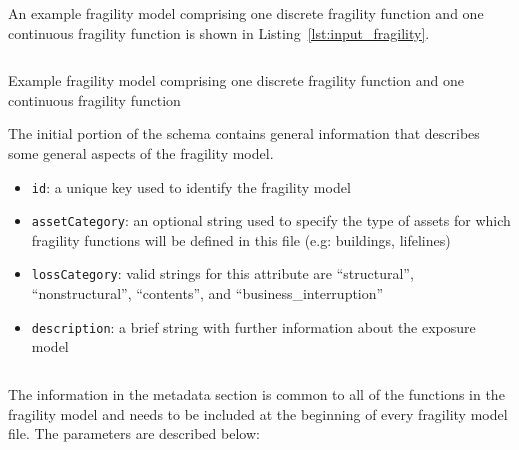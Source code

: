 An example \gls{fragility model} comprising one discrete \gls{fragility
function} and one continuous \gls{fragility function} is shown in Listing~\ref{lst:input_fragility}.

\begin{listing}[htbp]
  \inputminted[firstline=1,firstnumber=1,fontsize=\footnotesize,frame=single,linenos,bgcolor=lightgray]{xml}{oqum/risk/Verbatim/input_fragility.xml}
  \caption{Example fragility model comprising one discrete fragility function and one continuous fragility function}
  \label{lst:input_fragility}
\end{listing}


The initial portion of the schema contains general information that describes 
some general aspects of the \gls{fragility model}.

\begin{itemize}

    \item \Verb+id+: a unique key used to identify the \gls{fragility model}

    \item \Verb+assetCategory+: an optional string used to specify the type of
    \glspl{asset} for which \glspl{fragility function} will be defined in this
    file (e.g: buildings, lifelines)

    \item \Verb+lossCategory+: valid strings for this attribute are 
    ``structural'', ``nonstructural'', ``contents'', and 
    ``business\_interruption''

    \item \Verb+description+: a brief string with further information about the
    \gls{exposure model}

\end{itemize}

\inputminted[firstline=4,firstnumber=4,lastline=9,fontsize=\footnotesize,frame=single,linenos,bgcolor=lightgray]{xml}{oqum/risk/Verbatim/input_fragility.xml}

The information in the metadata section is common to all of the functions in
the \gls{fragility model} and needs to be included at the beginning of every
\gls{fragility model} file. The parameters are described below:

